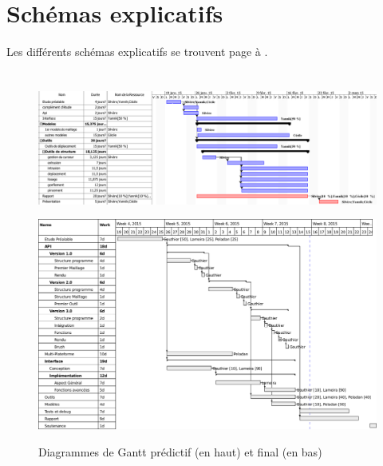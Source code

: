 \documentclass[a4paper]{memoir}
\begin{document}
		\section{Schémas explicatifs}
			Les différents schémas explicatifs se trouvent page \pageref{fig:subdivide} à \pageref{fig:cube}.
			
		\section*{}
			\newpage
			\begin{figure}
				\vspace{-3,5cm} \hspace{-4,5cm} \includegraphics[scale=0.6]{img/Gantt1.png}
			\end{figure}
			
			\begin{figure}
				\hspace{-5,25cm} \includegraphics[scale=0.5]{img/Gantt2.png}
				\label{fig:gantt}
				\caption{Diagrammes de Gantt prédictif (en haut) et final (en bas)}
			\end{figure}
			
\end{document}
